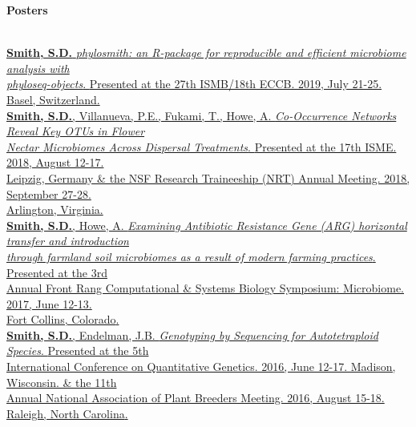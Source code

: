 \vspace{0.5cm}
{\Large \textbf{Posters}}\\[-0.4cm]
\makebox[\linewidth]{\rule{1.0\textwidth}{0.4pt}}\\
\vspace{.05cm}

\begin{addmargin}[0.5cm]{0cm}
\tab[-0.5cm]\href{https://schuyler-smith.github.io/posters/phylosmith}{{\color{black}\textbf{Smith, S.D.} 
    \textit{phylosmith: an R-package for reproducible and efficient microbiome analysis with \\[-0.1cm] 
    phyloseq-objects}. {Presented at the 27th ISMB/18th ECCB. 2019, July 21-25. Basel, Switzerland.}}} \\
\tab[-0.5cm]\href{https://schuyler-smith.github.io/posters/isme_2018}{{\color{black}\textbf{Smith, S.D.}, 
    Villanueva, P.E., Fukami, T., Howe, A. \textit{Co-Occurrence Networks Reveal Key OTUs in Flower \\[-0.1cm] 
    Nectar Microbiomes Across Dispersal Treatments}. {Presented at the 17th ISME. 2018, August 12-17. \\[-0.1cm] 
    Leipzig, Germany \& the NSF Research Traineeship (NRT) Annual Meeting. 2018, September 27-28. \\[-0.1cm] Arlington, Virginia.}}} \\
\tab[-0.5cm]\href{https://schuyler-smith.github.io/posters/p3_2017}{{\color{black}\textbf{Smith, S.D.}, 
    Howe, A. \textit{Examining Antibiotic Resistance Gene (ARG) horizontal transfer and introduction \\[-0.1cm] 
    through farmland soil microbiomes as a result of modern farming practices}. {Presented at the 3rd \\[-0.1cm] 
    Annual Front Rang Computational \& Systems Biology Symposium: Microbiome. 2017, June 12-13. \\[-0.1cm]
    Fort Collins, Colorado}.}} \\
\tab[-0.5cm]\href{https://schuyler-smith.github.io/posters/icqg_2016}{{\color{black}\textbf{Smith, S.D.}, 
    Endelman, J.B. \textit{Genotyping by Sequencing for Autotetraploid Species}. {Presented at the 5th \\[-0.1cm] 
    International Conference on Quantitative Genetics. 2016, June 12-17. Madison, Wisconsin. \& the 11th \\[-0.1cm] 
    Annual National Association of Plant Breeders Meeting. 2016, August 15-18. Raleigh, North Carolina}.}}\\
\end{addmargin}
